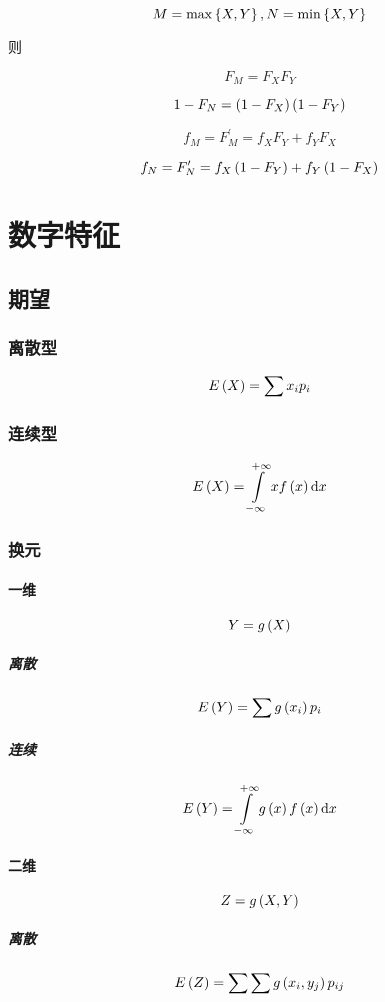 \documentclass{article}
\begin{document}
\[M=\max\left\{X,Y\right\},N=\min\left\{X,Y\right\}\]

则

\[F_M=F_XF_Y\]

\[1-F_N=\left(1-F_X\right)\left(1-F_Y\right)\]

\[f_M=F^\prime_M=f_XF_Y+f_YF_X\]

\[f_N=F^\prime_N=f_X\left(1-F_Y\right)+f_Y\left(1-F_X\right)\]

\section{数字特征}

\subsection{期望}

\subsubsection{离散型}

\[E\left(X\right)=\sum x_ip_i\]

\subsubsection{连续型}

\[E\left(X\right)=\int\limits_{-\infty}^{+\infty} xf\left(x\right)\mathrm d x\]

\subsubsection{换元}

\paragraph{一维}

\[Y=g\left(X\right)\]

\subparagraph{离散}

\[E\left(Y\right)=\sum g\left(x_i\right)p_i\]

\subparagraph{连续}

\[E\left(Y\right)=\int\limits_{-\infty}^{+\infty} g\left(x\right)f\left(x\right)\mathrm d x\]

\paragraph{二维}

\[Z=g\left(X,Y\right)\]

\subparagraph{离散}

\[E\left(Z\right)=\sum\sum g\left(x_i,y_j\right)p_{ij}\]
\end{document}
